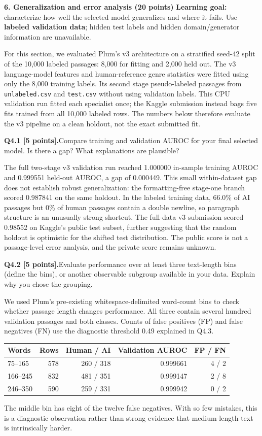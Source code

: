 \documentclass[11pt,letterpaper]{article}
\newcommand{\question}[2]{\par\vspace{6pt}\noindent\textbf{#1}\quad #2\par}
\begin{document}
\newpage

{\large\textbf{6. Generalization and error analysis (20 points)}}
\textbf{Learning goal:} characterize how well the selected model generalizes and where it fails. Use \textbf{labeled validation data}; hidden test labels and hidden domain/generator information are unavailable.

For this section, we evaluated Plum's v3 architecture on a stratified seed-42 split of the 10,000 labeled passages: 8,000 for fitting and 2,000 held out. The v3 language-model features and human-reference genre statistics were fitted using only the 8,000 training labels. Its second stage pseudo-labeled passages from \texttt{unlabeled.csv} and \texttt{test.csv} without using validation labels. This CPU validation run fitted each specialist once; the Kaggle submission instead bags five fits trained from all 10,000 labeled rows. The numbers below therefore evaluate the v3 pipeline on a clean holdout, not the exact submitted fit.

\question{Q4.1 [5 points].}{Compare training and validation AUROC for your final selected model. Is there a gap? What explanations are plausible?}
The full two-stage v3 validation run reached 1.000000 in-sample training AUROC and 0.999551 held-out AUROC, a gap of 0.000449. This small within-dataset gap does not establish robust generalization: the formatting-free stage-one branch scored 0.987841 on the same holdout. In the labeled training data, 66.0\% of AI passages but 0\% of human passages contain a double newline, so paragraph structure is an unusually strong shortcut. The full-data v3 submission scored 0.98552 on Kaggle's public test subset, further suggesting that the random holdout is optimistic for the shifted test distribution. The public score is not a passage-level error analysis, and the private score remains unknown.
\question{Q4.2 [5 points].}{Evaluate performance over at least three text-length bins (define the bins), or another observable subgroup available in your data. Explain why you chose the grouping.}
We used Plum's pre-existing whitespace-delimited word-count bins to check whether passage length changes performance. All three contain several hundred validation passages and both classes. Counts of false positives (FP) and false negatives (FN) use the diagnostic threshold 0.49 explained in Q4.3.
\begin{tabular}{lrrrr}\toprule Words & Rows & Human / AI & Validation AUROC & FP / FN \\ \midrule
75--165 & 578 & 260 / 318 & 0.999661 & 4 / 2 \\
166--245 & 832 & 481 / 351 & 0.999147 & 2 / 8 \\
246--350 & 590 & 259 / 331 & 0.999942 & 0 / 2 \\ \bottomrule
\end{tabular}
The middle bin has eight of the twelve false negatives. With so few mistakes, this is a diagnostic observation rather than strong evidence that medium-length text is intrinsically harder.
\end{document}
